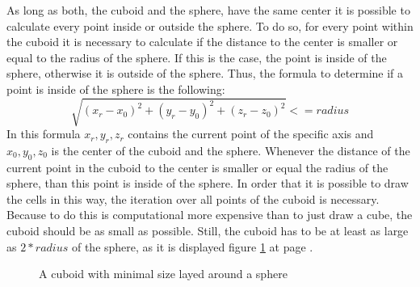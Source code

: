 As long as both, the cuboid and the sphere, have the same center it is possible to calculate every point inside or outside the sphere\cite{REF}. To do so, for every point within the cuboid it is necessary to calculate if the distance to the center is smaller or equal to the radius of the sphere. If this is the case, the point is inside of the sphere, otherwise it is outside of the sphere. Thus, the formula to determine if a point is inside of the sphere is the following:
\begin{equation}
\sqrt{(x_{r}-x_{0})^2 + (y_{r}-y_{0})^2 + (z_{r}-z_{0})^2} <= radius
\end{equation}
In this formula $x_{r},y_{r},z_{r}$ contains the current point of the specific axis and $x_{0},y_{0},z_{0}$ is the center of the cuboid and the sphere. Whenever the distance of the current point in the cuboid to the center is smaller or equal the radius of the sphere, than this point is inside of the sphere. \newline
In order that it is possible to draw the cells in this way, the iteration over all points of the cuboid is necessary. Because to do this is computational more expensive than to just draw a cube, the cuboid should be as small as possible. Still, the cuboid has to be at least as large as $2*radius$ of the sphere, as it is displayed figure \ref{tikz:CuboidSphere} at page \pageref{tikz:CuboidSphere}.
\begin{figure}
\begin{center}
\caption{A cuboid with minimal size layed around a sphere}
\label{tikz:CuboidSphere}
\end{center}
\end{figure}


